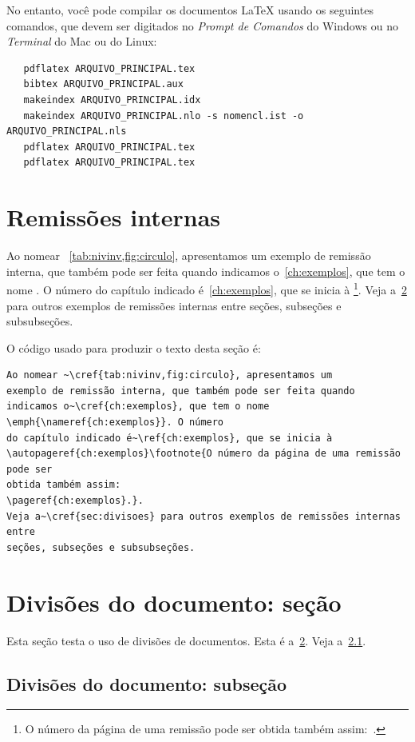 No entanto, você pode compilar os documentos \LaTeX{} usando os seguintes
comandos, que devem ser digitados no \emph{Prompt de Comandos} do Windows ou no
\emph{Terminal} do Mac ou do Linux:

\begin{verbatim}
   pdflatex ARQUIVO_PRINCIPAL.tex
   bibtex ARQUIVO_PRINCIPAL.aux
   makeindex ARQUIVO_PRINCIPAL.idx
   makeindex ARQUIVO_PRINCIPAL.nlo -s nomencl.ist -o ARQUIVO_PRINCIPAL.nls
   pdflatex ARQUIVO_PRINCIPAL.tex
   pdflatex ARQUIVO_PRINCIPAL.tex
\end{verbatim}

\section{Remissões internas}

Ao nomear ~\cref{tab:nivinv,fig:circulo}, apresentamos um
exemplo de remissão interna, que também pode ser feita quando indicamos o~\cref{ch:exemplos}, que tem o nome \emph{}. O número
do capítulo indicado é~\ref{ch:exemplos}, que se inicia à
\footnote{O número da página de uma remissão pode ser
	obtida também assim:~\pageref{ch:exemplos}.}.
Veja a~\cref{sec:divisoes} para outros exemplos de remissões internas entre
seções, subseções e subsubseções.

O código usado para produzir o texto desta seção é:

\begin{verbatim}
Ao nomear ~\cref{tab:nivinv,fig:circulo}, apresentamos um
exemplo de remissão interna, que também pode ser feita quando indicamos o~\cref{ch:exemplos}, que tem o nome \emph{\nameref{ch:exemplos}}. O número
do capítulo indicado é~\ref{ch:exemplos}, que se inicia à
\autopageref{ch:exemplos}\footnote{O número da página de uma remissão pode ser
obtida também assim:
\pageref{ch:exemplos}.}.
Veja a~\cref{sec:divisoes} para outros exemplos de remissões internas entre
seções, subseções e subsubseções.
\end{verbatim}

\section{Divisões do documento:
  seção}%
\label{sec:divisoes}

Esta seção testa o uso de divisões de documentos. Esta é a~\cref{sec:divisoes}.
Veja a~\cref{subsec:divisoes}.

\subsection{Divisões do documento:
	subseção}%
\label{subsec:divisoes}


